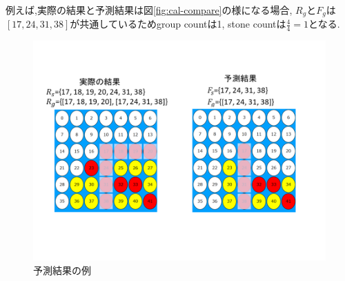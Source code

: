 例えば,実際の結果と予測結果は図\ref{fig:cal-compare}の様になる場合, $R_g$と$F_g$は$[17, 24, 31, 38]$が共通しているためgroup countは1, stone countは$\frac{4}{4}=1$となる.
\begin{figure}[t]
	\centering
	\includegraphics[width=\linewidth]{./figure/cal-compare.png}
	\caption{予測結果の例}
	\label{fig:fatalGroup}
\end{figure}


